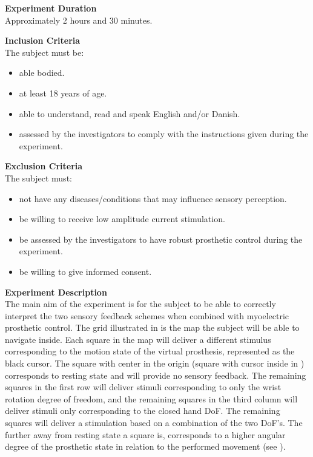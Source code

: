 \textbf{Experiment Duration} \\
Approximately 2 hours and 30 minutes.

\textbf{Inclusion Criteria} \\
The subject must be:
\vspace{-15pt}
\begin{itemize}
	\item able bodied. %
	\item at least 18 years of age.
	\item able to understand, read and speak English and/or Danish.
	\item assessed by the investigators to comply with the instructions given during the experiment.
\end{itemize}

\textbf{Exclusion Criteria} \\
The subject must:
\vspace{-15pt}
\begin{itemize}
	\item not have any diseases/conditions that may influence sensory perception.
	\item be willing to receive low amplitude current stimulation. 
	\item be assessed by the investigators to have robust prosthetic control during the experiment. 
	\item be willing to give informed consent. 
\end{itemize}

\textbf{{\Large Experiment Description}} \\
\newline
The main aim of the experiment is for the subject to be able to correctly interpret the two sensory feedback schemes when combined with myoelectric prosthetic control. The grid illustrated in  is the map the subject will be able to navigate inside. Each square in the map will deliver a different stimulus corresponding to the motion state of the virtual prosthesis, represented as the black cursor. The square with center in the origin (square with cursor inside in ) corresponds to resting state and will provide no sensory feedback. The remaining squares in the first row will deliver stimuli corresponding to only the wrist rotation degree of freedom, and the remaining squares in the third column will deliver stimuli only corresponding to the closed hand DoF. The remaining squares will deliver a stimulation based on a combination of the two DoF's. The further away from resting state a square is, corresponds to a higher angular degree of the prosthetic state in relation to the performed movement (see ). 

